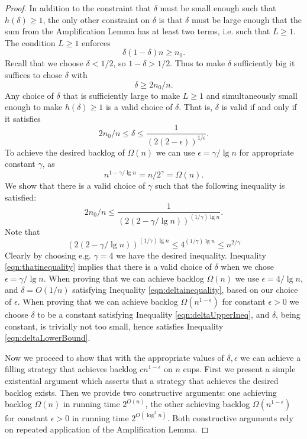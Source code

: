 \documentclass[twocolumn]{article}[10pt]
\begin{document}
\begin{proof}
  In addition to the constraint that $\delta$ must be small enough such that
  $h(\delta) \ge 1$, the only other constraint on $\delta$ is that $\delta$
  must be large enough that the sum from the Amplification Lemma has at least two terms, i.e. such that $L \ge 1$.
  The condition $L \ge 1$ enforces 
  $$\delta(1-\delta)n \ge n_0. $$
  Recall that we choose $\delta < 1/2$, so $1-\delta > 1/2$. Thus to make
  $\delta$ sufficiently big it suffices to chose $\delta$ with 
  \begin{equation}
    \label{eqn:deltaLowerBound}
    \delta \ge 2n_0/n.
  \end{equation}
  Any choice of $\delta$ that is sufficiently large to make $L \ge 1$ and
  simultaneously small enough to make $h(\delta) \ge 1$ is a valid choice of
  $\delta$. That is, $\delta$ is valid if and only if it satisfies
  \begin{equation}
    \label{eqn:deltainequality}
       2n_0/n \le \delta \le  \frac{1}{(2(2-\epsilon))^{1/\epsilon}}.
  \end{equation}
  To achieve the desired backlog of $\Omega(n)$ we can use $\epsilon =
  \gamma/\lg n$ for appropriate constant $\gamma$, as $$n^{1-\gamma/\lg n} =
  n/2^\gamma = \Omega(n).$$
  We show that there is a valid choice of $\gamma$ such that the following inequality is satisfied:
  \begin{equation}
    \label{eqn:thatinequality}
   2n_0/n \le \frac{1}{(2(2-\gamma/\lg n))^{(1/\gamma)\lg n}}.
  \end{equation}
  Note that 
  $$(2(2-\gamma/\lg n))^{(1/\gamma)\lg n} \le 4^{(1/\gamma)\lg n} \le n^{2/\gamma}$$
  Clearly by choosing e.g. $\gamma = 4$ we have the desired inequality.
  Inequality \ref{eqn:thatinequality} implies that there is a valid choice of
  $\delta$ when we chose $\epsilon = \gamma / \lg n$. When proving that we can
  achieve backlog $\Omega(n)$ we use $\epsilon = 4 / \lg n$, and $\delta =
  O(1/n)$ satisfying Inequality \ref{eqn:deltainequality}, based on our choice
  of $\epsilon$. When proving that we can achieve backlog
  $\Omega(n^{1-\epsilon})$ for constant $\epsilon > 0$ we choose $\delta$ to be
  a constant satisfying Inequality \ref{eqn:deltaUpperIneq}, and $\delta$, being constant, is
  trivially not too small, hence satisfies Inequality \ref{eqn:deltaLowerBound}.

  Now we proceed to show that with the appropriate values of $\delta, \epsilon$ we
  can achieve a filling strategy that achieves backlog $cn^{1-\epsilon}$ on $n$ cups.
  First we present a simple existential argument which asserts that a strategy
  that achieves the desired backlog exists. Then we provide two constructive
  arguments: one achieving backlog $\Omega(n)$ in running time $2^{O(n)}$,
  the other achieving backlog $\Omega(n^{1-\epsilon})$ for constant $\epsilon>
  0$ in running time $2^{O(\log^2 n)}$. Both constructive arguments rely on
  repeated application of the Amplification Lemma.
  

\end{proof}
\end{document}
